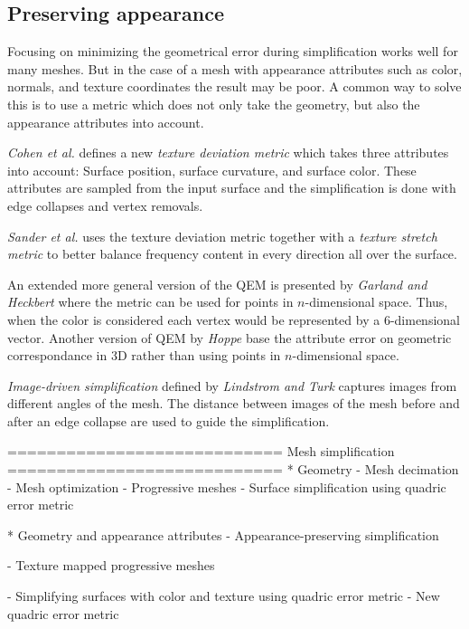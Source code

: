 \subsection{Preserving appearance}
Focusing on minimizing the geometrical error during simplification works well for many meshes. But in the case of a mesh with appearance attributes such as color, normals, and texture coordinates the result may be poor. A common way to solve this is to use a metric which does not only take the geometry, but also the appearance attributes into account.

\emph{Cohen et al.} \cite{cohen1998appearance} defines a new \emph{texture deviation metric} which takes three attributes into account: Surface position, surface curvature, and surface color. These attributes are sampled from the input surface and the simplification is done with edge collapses and vertex removals.

\emph{Sander et al.} \cite{sander2001texture} uses the texture deviation metric together with a \emph{texture stretch metric} to better balance frequency content in every direction all over the surface.

An extended more general version of the QEM is presented by \emph{Garland and Heckbert} \cite{garland1998simplifying} where the metric can be used for points in $n$-dimensional space. Thus, when the color is considered each vertex would be represented by a 6-dimensional vector. Another version of QEM by \emph{Hoppe} \cite{Hoppe:1999:NQM:319351.319357} base the attribute error on geometric correspondance in 3D rather than using points in $n$-dimensional space.

\emph{Image-driven simplification} defined by \emph{Lindstrom and Turk} \cite{lindstrom2000image} captures images from different angles of the mesh. The distance between images of the mesh before and after an edge collapse are used to guide the simplification.

\iffalse %

============================
 Mesh simplification
============================
* Geometry
  - Mesh decimation
  - Mesh optimization
  - Progressive meshes
  - Surface simplification using quadric error metric
  
* Geometry and appearance attributes
  - Appearance-preserving simplification

  - Texture mapped progressive meshes
  
  - Simplifying surfaces with color and texture using quadric error metric
  - New quadric error metric

